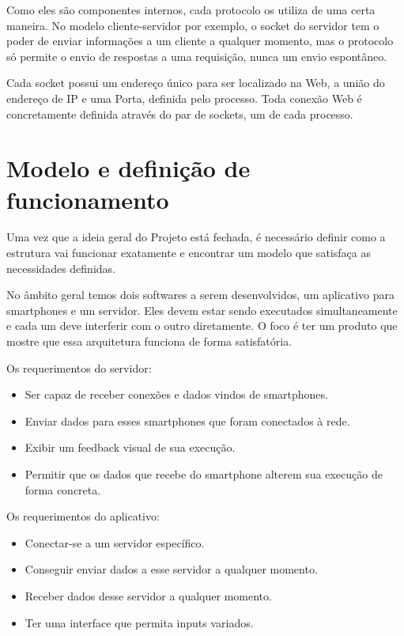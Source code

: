 \documentclass[a4paper,12pt]{article}
\begin{document}
Como eles são componentes internos, cada protocolo os utiliza de uma certa maneira. No modelo cliente-servidor por exemplo, o socket do servidor tem o poder de enviar informações a um cliente a qualquer momento, mas o protocolo só permite o envio de respostas a uma requisição, nunca um envio espontâneo.

Cada socket possui um endereço único para ser localizado na Web, a união do endereço de IP e uma Porta, definida pelo processo. Toda conexão Web é concretamente definida através do par de sockets, um de cada processo.






\newpage
\section{Modelo e definição de funcionamento}


Uma vez que a ideia geral do Projeto está fechada, é necessário definir como a estrutura vai funcionar exatamente e encontrar um modelo que satisfaça as necessidades definidas.

No âmbito geral temos dois softwares a serem desenvolvidos, um aplicativo para smartphones e um servidor. Eles devem estar sendo executados simultaneamente e cada um deve interferir com o outro diretamente. O foco é ter um produto que mostre que essa arquitetura funciona de forma satisfatória.

Os requerimentos do servidor:

\begin{itemize}

    \item Ser capaz de receber conexões e dados vindos de smartphones.

    \item Enviar dados para esses smartphones que foram conectados à rede.

    \item Exibir um feedback visual de sua execução.

    \item Permitir que os dados que recebe do smartphone alterem sua execução de forma concreta.

\end{itemize}

Os requerimentos do aplicativo:

\begin{itemize}

    \item Conectar-se a um servidor específico.

    \item Conseguir enviar dados a esse servidor a qualquer momento.

    \item Receber dados desse servidor a qualquer momento.

    \item Ter uma interface que permita inputs variados.

\end{itemize}
\end{document}
